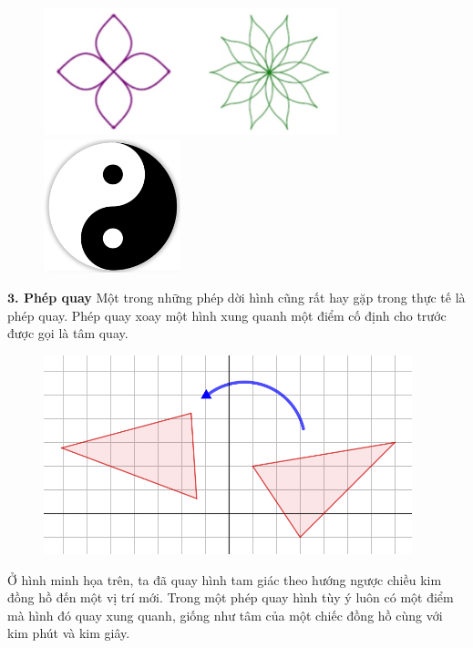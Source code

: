 \begin{multicols}{2}
\begin{figure}[H]
		\includegraphics[width= 0.46\linewidth]{Picture15}
		\includegraphics[width= 0.46\linewidth]{Picture16}
		\vspace*{-10pt}
	\end{figure}
	\textbf{\color{toancuabi}$\pmb3$. Phép quay}
	\vskip 0.1cm
	Một trong những phép dời hình cũng rất hay gặp trong thực tế là phép quay. Phép quay xoay một hình xung quanh một điểm cố định cho trước được gọi là tâm quay.
	\begin{figure}[H]
		\vspace*{-5pt}
		\centering
		\captionsetup{labelformat= empty, justification=centering}
		\includegraphics[width= 1\linewidth]{Picture17}
		\vspace*{-10pt}
	\end{figure}
	Ở hình minh họa trên, ta đã quay hình tam giác theo hướng ngược chiều kim đồng hồ đến một vị trí mới. Trong một phép quay hình tùy ý luôn có một điểm mà hình đó quay xung quanh, giống như tâm của một chiếc đồng hồ cùng với kim phút và kim giây.

\end{multicols}

